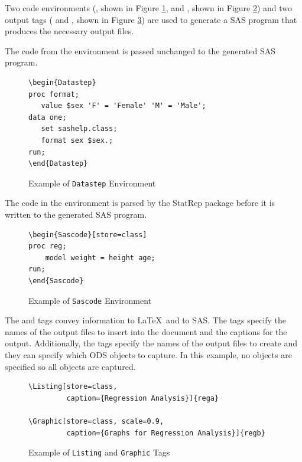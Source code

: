 \documentclass[article,oneside]{memoir}
\newcommand*{\StatRep}{\textsf{StatRep}\xspace}
\begin{document}
  Two code environments
  (, shown in Figure \ref{fig:d1}, and
  , shown in Figure \ref{fig:s1})
  and two output tags
  ( and , shown in Figure \ref{fig:slg})
  are used to generate a SAS program that produces
  the necessary output files.

  The code from the  environment is passed unchanged to the
  generated SAS program.
\begin{figure}[H]
\begin{snugshade}
\begin{verbatim}
\begin{Datastep}
proc format;
   value $sex 'F' = 'Female' 'M' = 'Male';
data one;
   set sashelp.class;
   format sex $sex.;
run;
\end{Datastep}
\end{verbatim}
\end{snugshade}
\caption{Example of \texttt{Datastep} Environment}\label{fig:d1}
\end{figure}

  The code in the  environment is parsed by the \StatRep package before it is
  written to the generated SAS program.

\begin{figure}[H]
\begin{snugshade}
\begin{verbatim}
\begin{Sascode}[store=class]
proc reg;
    model weight = height age;
run;
\end{Sascode}
\end{verbatim}
\end{snugshade}
\caption{Example of \texttt{Sascode} Environment}\label{fig:s1}
\end{figure}

  The  and  tags convey information to \LaTeX\ and to SAS.
  The tags specify the names of the output files to insert into the document
  and the captions for the output.
  Additionally, the tags specify the names of the output files to
  create and they can specify which
  ODS objects to capture. In this example, no objects are specified so all
  objects are captured.

\begin{figure}[H]
\begin{snugshade}
\begin{verbatim}
\Listing[store=class,
         caption={Regression Analysis}]{rega}

\Graphic[store=class, scale=0.9,
         caption={Graphs for Regression Analysis}]{regb}
\end{verbatim}
\end{snugshade}
\caption{Example of \texttt{Listing} and \texttt{Graphic} Tags}\label{fig:slg}
\end{figure}
\end{document}
